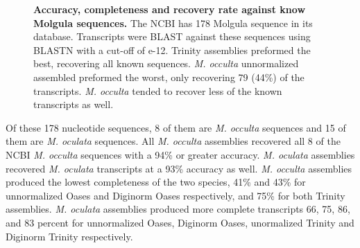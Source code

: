 \documentclass[fleqn,10pt]{wlpeerj}
\begin{document}
\setcounter{subfigure}{0}
\begin{figure}[tbp]
	\begin{center}
	\end{center}
	\caption{\textbf{Accuracy, completeness and recovery rate against know Molgula sequences.} The NCBI has 178 Molgula sequence in its database. Transcripts were BLAST against these sequences using BLASTN with a cut-off of e-12. Trinity assemblies preformed the best, recovering all known sequences. \textit{M. occulta} unnormalized assembled preformed the worst, only recovering 79 (44\%) of the transcripts. \textit{M. occulta} tended to recover less of the known transcripts as well.}
	\label{fig:known_molg}
\end{figure}
     
Of these 178 nucleotide sequences, 8 of them are \textit{M. occulta} sequences and 15 of them are \textit{M. oculata} sequences. All \textit{M. occulta} assemblies recovered all 8 of the NCBI \textit{M. occulta} sequences with a 94\% or greater accuracy. \textit{M. oculata} assemblies recovered \textit{M. oculata} transcripts at a 93\% accuracy as well. \textit{M. occulta} assemblies produced the lowest completeness of the two species, 41\% and 43\% for unnormalized Oases and Diginorm Oases respectively, and 75\% for both Trinity assemblies. \textit{M. oculata} assemblies produced more complete transcripts 66, 75, 86, and 83 percent for unnormalized Oases, Diginorm Oases, unormalized Trinity and Diginorm Trinity respectively.
\end{document}
